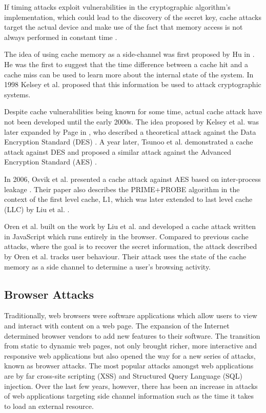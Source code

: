 \documentclass[10pt,a4paper,twoside]{book}
\begin{document}
If timing attacks exploit vulnerabilities in the cryptographic algorithm's implementation, which could lead to the discovery of the secret key, cache attacks target the actual device and make use of the fact that memory access is not always performed in constant time \cite{canteaut2006understanding}.

The idea of using cache memory as a side-channel was first proposed by Hu in \cite{hu1992lattice}. He was the first to suggest that the time difference between a cache hit and a cache miss can be used to learn more about the internal state of the system. In 1998 Kelsey et al. \cite{kelsey1998side} proposed that this information be used to attack cryptographic systems. 

Despite cache vulnerabilities being known for some time, actual cache attack have not been developed until the early 2000s. The idea proposed by Kelsey et al. \cite{kelsey1998side} was later expanded by Page in \cite{page2002theoretical}, who described a theoretical attack against the Data Encryption Standard (DES) \cite{standard1977federal}. A year later, Tsunoo et al. \cite{tsunoo2003cryptanalysis} demonstrated a cache attack against DES and proposed a similar attack against the Advanced Encryption Standard (AES) \cite{pub2001197} .

In 2006, Osvik et al. presented a cache attack against AES based on inter-process leakage \cite{osvik2006cache}. Their paper also describes the PRIME+PROBE algorithm in the context of the first level cache, L1, which was later extended to last level cache (LLC) by Liu et al. \cite{liu2015last}.

Oren et al.  \cite{oren2015spy} built on the work by Liu et al. \cite{liu2015last} and developed a cache attack written in JavaScript which runs entirely in the browser. Compared to previous cache attacks, where the goal is to recover the secret information, the attack described by Oren et al. \cite{oren2015spy} tracks user behaviour. Their attack uses the state of the cache memory as a side channel to determine a user's browsing activity.


\subsection{Browser Attacks}
Traditionally, web browsers were software applications which allow users to view and interact with content on a web page. The expansion of the Internet determined browser vendors to add new features to their software. The transition from static to dynamic web pages, not only brought richer, more interactive and responsive web applications but also opened the way for a new series of attacks, known as browser attacks. The most popular attacks amongst web applications are by far cross-site scripting (XSS) and Structured Query Language (SQL) injection. Over the last few years, however, there has been an increase in attacks of web applications targeting side channel information such as the time it takes to load an external resource.
\end{document}
